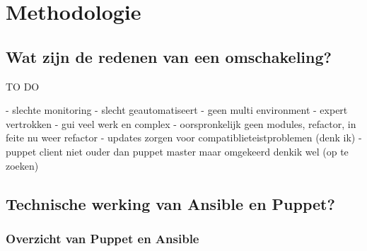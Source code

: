 
\chapter{Methodologie}
\label{ch:methodologie}


\section{Wat zijn de redenen van een omschakeling?}
\label{sec:methodologie-redenen-omschakeling}

TO DO

- slechte monitoring
- slecht geautomatiseert 
- geen multi environment
- expert vertrokken
- gui veel werk en complex
- oorspronkelijk geen modules, refactor, in feite nu weer refactor
- updates zorgen voor compatiblieteistproblemen (denk ik)
- puppet client niet ouder dan puppet master maar omgekeerd denkik wel (op te zoeken)

\section{Technische werking van Ansible en Puppet?}
\label{sec:methodologie-technische-verschillen}

\subsection{Overzicht van Puppet en Ansible}



